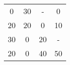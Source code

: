 \begin{tabular}{cccc}
\rowcolor[rgb]{ .749,  .749,  .749} 0      & 30     & -      & 0 \\
20     & \cellcolor[rgb]{ .749,  .749,  .749} 20 & \cellcolor[rgb]{ .749,  .749,  .749} 0 & 10 \\
30     & \cellcolor[rgb]{ .749,  .749,  .749} 0 & \cellcolor[rgb]{ .749,  .749,  .749} 20 & - \\
20     & \cellcolor[rgb]{ .749,  .749,  .749} 0 & \cellcolor[rgb]{ .749,  .749,  .749} 40 & 50 \bigstrut[b]\\
\hline
\hline
\end{tabular}%
